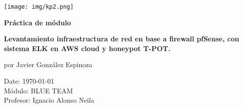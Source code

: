 \documentclass[12pt,oneside,a4paper]{book}
\makeatletter
\renewcommand{\headrulewidth}{0.2pt}
\renewcommand\tableofcontents{%
    \if@twocolumn
      \@restonecoltrue\onecolumn
    \else
      \@restonecolfalse
    \fi
    \section*{\contentsname
        \@mkboth{%
           \MakeUppercase\contentsname}{\MakeUppercase\contentsname}}%
    \@starttoc{toc}%
    \if@restonecol\twocolumn\fi
    }
\makeatother
\begin{document}
\renewcommand{\headrulewidth}{0pt}








\begin{titlepage}
   \thispagestyle{fancy}
   \begin{center}
        \vspace{5em}
   
        \centering\texttt{[image: img/kp2.png]}

        \vspace{5em}

        \huge{\textbf{Práctica de módulo}}

        \vspace{2em}
        
        \huge{\textbf{Levantamiento infraestructura de red en base a firewall pfSense, con sistema ELK en AWS cloud y honeypot T-POT. \\}}
        
        \vspace{5em}

        \Large{por Javier González Espinoza}

        \vspace{6em}
        
   \end{center}

    \normalsize{Date: \today \\
     Módulo: BLUE TEAM \\
     Profesor: Ignacio Alonso Neila}
    
\end{titlepage}

\renewcommand{\headrulewidth}{0.2pt}

\newpage

\tableofcontents

\newpage














\end{document}
